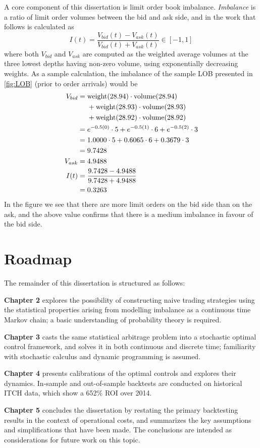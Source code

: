 A core component of this dissertation is limit order book imbalance. \emph{Imbalance} is a ratio of limit order volumes between the bid and ask side, and in the work that follows is calculated as 
\begin{equation}\label{eq:LOBImbalance}
I(t) = \dfrac{V_{bid}(t) - V_{ask}(t)}{V_{bid}(t) + V_{ask}(t)} \in [-1,1]
\end{equation}
where both $V_{bid}$ and $V_{ask}$ are computed as the weighted average volumes at the three lowest depths having non-zero volume, using exponentially decreasing weights. As a sample calculation, the imbalance of the sample LOB presented in \autoref{fig:LOB} (prior to order arrivals) would be
\begin{align*}
V_{bid} & = \text{weight}(28.94)\cdot\text{volume}(28.94) \\
& \hphantom{{}={}} + \text{weight}(28.93)\cdot\text{volume}(28.93) \\
& \hphantom{{}={}} + \text{weight}(28.92)\cdot\text{volume}(28.92) \\
& = e^{-0.5 (0)} \cdot 5 + e^{-0.5 (1)} \cdot 6 + e^{-0.5 (2)} \cdot 3\\
& = 1.0000 \cdot 5 + 0.6065 \cdot 6 + 0.3679 \cdot 3 \\
& = 9.7428 \\
V_{ask} & = 4.9488 \\
I(t) & = \dfrac{9.7428 - 4.9488}{9.7428 + 4.9488} \\
&  = 0.3263
\end{align*}
In the figure we see that there are more limit orders on the bid side than on the ask, and the above value confirms that there is a medium imbalance in favour of the bid side.

\section{Roadmap}
The remainder of this dissertation is structured as follows:

{\bf Chapter 2} explores the possibility of constructing naive trading strategies using the statistical properties arising from modelling imbalance as a continuous time Markov chain; a basic understanding of probability theory is required. 

{\bf Chapter 3} casts the same statistical arbitrage problem into a stochastic optimal control framework, and solves it in both continuous and discrete time; familiarity with stochastic calculus and dynamic programming is assumed. 

{\bf Chapter 4} presents calibrations of the optimal controls and explores their dynamics. In-sample and out-of-sample backtests are conducted on historical ITCH data, which show a 652\% ROI over 2014.

{\bf Chapter 5} concludes the dissertation by restating the primary backtesting results in the context of operational costs, and summarizes the key assumptions and simplifications that have been made. The conclusions are intended as considerations for future work on this topic.